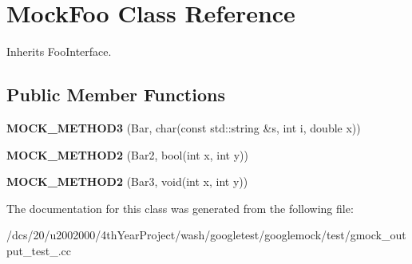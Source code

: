 \hypertarget{classMockFoo}{}\section{Mock\+Foo Class Reference}
\label{classMockFoo}


Inherits Foo\+Interface.

\subsection*{Public Member Functions}
\begin{DoxyCompactItemize}
\item 
\mbox{\label{classMockFoo_a8f323a65afd93c0605a02b278b101d18}} 
{\bfseries M\+O\+C\+K\+\_\+\+M\+E\+T\+H\+O\+D3} (Bar, char(const std\+::string \&s, int i, double x))
\item 
\mbox{\label{classMockFoo_ae1d53263d5efcf38fda3990302fac6ab}} 
{\bfseries M\+O\+C\+K\+\_\+\+M\+E\+T\+H\+O\+D2} (Bar2, bool(int x, int y))
\item 
\mbox{\label{classMockFoo_af1e0c374cadacdaa7ca69f9c38d85543}} 
{\bfseries M\+O\+C\+K\+\_\+\+M\+E\+T\+H\+O\+D2} (Bar3, void(int x, int y))
\end{DoxyCompactItemize}


The documentation for this class was generated from the following file\+:\begin{DoxyCompactItemize}
\item 
/dcs/20/u2002000/4th\+Year\+Project/wash/googletest/googlemock/test/gmock\+\_\+output\+\_\+test\+\_\+.\+cc\end{DoxyCompactItemize}
